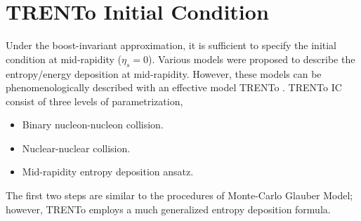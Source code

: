 \documentclass[aps,prl,twocolumn,groupedaddress]{revtex4-1}
\begin{document}
	
	
	\section{TRENTo Initial Condition}
	Under the boost-invariant approximation, it is sufficient to specify the initial condition at mid-rapidity ($\eta_s = 0$). Various models were proposed to describe the entropy/energy deposition at mid-rapidity. 
	However, these models can be phenomenologically described with an effective model TRENTo \cite{Moreland:2014oya}. 
	TRENTo IC consist of three levels of parametrization,
	\begin{itemize}
		\item Binary nucleon-nucleon collision.
		\item Nuclear-nuclear collision. 
		\item Mid-rapidity entropy deposition ansatz.
	\end{itemize}
	The first two steps are similar to the procedures of Monte-Carlo Glauber Model; however, TRENTo employs a much generalized entropy deposition formula.
\end{document}
